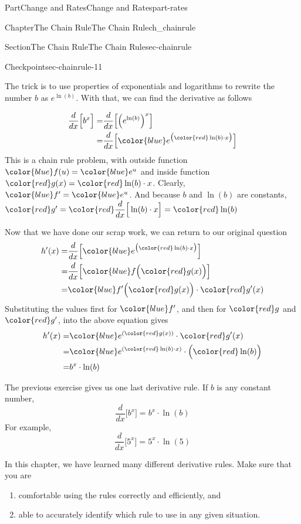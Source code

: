 \documentclass{tufte-book}
\numberwithin{equation}{chapter}
\newcommand{\red}[1]{   {\color{red}   #1}   }
\newcommand{\blue}[1]{  {\color{blue}  #1}  }
\newcommand{\ddx}[1]{ \dfrac{d}{dx} \Big[ #1 \Big]  }
\newcommand{\amp}{&}
\begin{document}
\begin{partptx}{Part}{Change and Rates}{}{Change and Rates}{}{}{part-rates}
\begin{chapterptx}{Chapter}{The Chain Rule}{}{The Chain Rule}{}{}{ch_chainrule}
\begin{sectionptx}{Section}{The Chain Rule}{}{The Chain Rule}{}{}{sec-chainrule}
\begin{inlineexercise}{Checkpoint}{}{sec-chainrule-11}
\par
The trick is to use properties of exponentials and logarithms to rewrite the number \(b\) as \(e^{\ln(b)}\). With that, we can find the derivative as follows%
\par
%
\begin{align*}
\ddx{ b^{x} } = \amp \ddx{ \Big(e^{\ln(b)}\Big)^x } \\
= \amp \ddx{ \blue {e^{\big(\red{\ln(b)\cdot x}\big)} } } 
\end{align*}
This is a chain rule problem, with outside function \(\blue{f(u)}=\blue{e^u}\) and inside function \(\red{g(x)} = \red{\ln(b)\cdot x}\). Clearly, \(\blue{f'} = \blue{e^u}\). And because  \(b\) and \(\ln(b)\) are constants, \(\red{g'} = \red{\ddx{\ln(b)\cdot x}} = \red{\ln(b)}\)%
\par
Now that we have done our scrap work, we can return to our original question%
\begin{align*}
h'(x) = \amp 
\ddx{\blue{ e^{\big(\red{\ln(b)\cdot x}\big)} } }  \\
= \amp \ddx{ \blue{f\Big( \red{g(x)} \Big) } }\\
= \amp \blue{f'\Big( \red{g(x)}\Big)}\cdot \red{g'(x)}
\end{align*}
Substituting the values first for \(\blue{f'}\), and then for  \(\red{g}\) and \(\red{g'}\), into the above equation gives%
\begin{align*}
h'(x) = \amp 
\blue{ e^{(\red{g(x)})} }\cdot \red{g'(x)}\\
= \amp 
\blue{ e^{(\red{\ln(b)\cdot x})} }\cdot \Big(\red{\ln(b)}\Big)\\
= \amp b^x \cdot \ln(b)
\end{align*}
%
\end{inlineexercise}%
The previous exercise gives us one last derivative rule.  If \(b\) is any constant number,%
\begin{equation*}
\ddx{b^x} = b^x \cdot \ln(b)
\end{equation*}
For example,%
\begin{equation*}
\ddx{5^x} = 5^x \cdot \ln(5)
\end{equation*}
%
\par
In this chapter, we have learned many different derivative rules.  Make sure that you are%
\begin{enumerate}
\item{}comfortable using the rules correctly and efficiently, and%
\item{}able to accurately identify which rule to use in any given situation.%

\end{enumerate}
\end{sectionptx}
\end{chapterptx}
\end{partptx}
\end{document}
